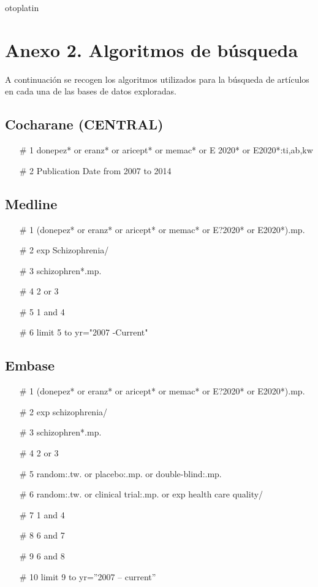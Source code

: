 otoplatin\documentclass[a4paper,openright,12pt]{report}
\begin{document}
\chapter{Anexo 2. Algoritmos de búsqueda}\label{cap.algoritmos}
\begin{normalsize}
A continuación se recogen los algoritmos utilizados para la búsqueda de artículos en cada una de las bases de datos exploradas.
\section{Cocharane (CENTRAL)}
\begin{normalsize}
\begin{itemize}
\item[\# 1] donepez* or eranz* or aricept* or memac* or E 2020* or E2020*:ti,ab,kw        
\item[\# 2] Publication Date from 2007 to 2014
\end{itemize}
\end{normalsize}

\section{Medline}
\begin{itemize}
\item[\# 1] (donepez* or eranz* or aricept* or memac* or E?2020* or E2020*).mp. 
\item[\# 2] exp Schizophrenia/ 
\item[\# 3] schizophren*.mp. 
\item[\# 4] 2 or 3 
\item[\# 5] 1 and 4 
\item[\# 6] limit 5 to yr="2007 -Current" 
\end{itemize}
\end{normalsize}

\section{Embase}
\begin{normalsize}
\begin{itemize}
\item[\# 1] (donepez* or eranz* or aricept* or memac* or E?2020* or E2020*).mp. 
\item[\# 2] exp schizophrenia/ 
\item[\# 3] schizophren*.mp. 
\item[\# 4] 2 or 3 
\item[\# 5] random:.tw. or placebo:.mp. or double-blind:.mp.
\item[\# 6] random:.tw. or clinical trial:.mp. or exp health care quality/ 
\item[\# 7] 1 and 4
\item[\# 8] 6 and 7 
\item[\# 9] 6 and 8 
\item[\# 10] limit 9 to yr=”2007 – current”
\end{itemize}
\end{normalsize}
\end{document}
